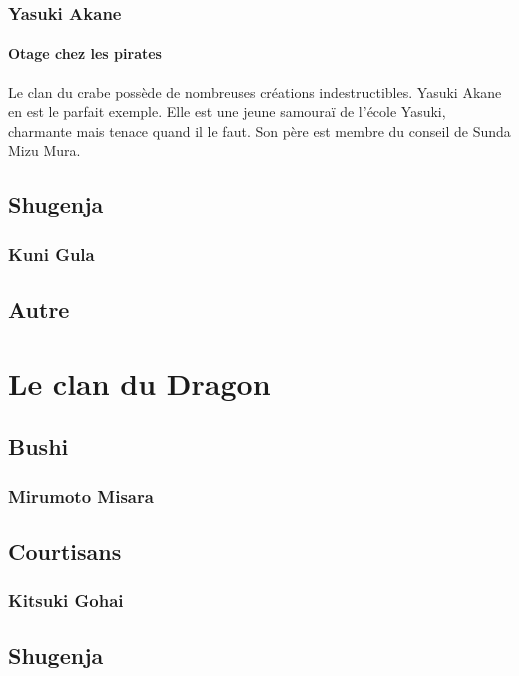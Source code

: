 \documentclass[10pt,a4paper]{book}
\begin{document}
\subsection{Yasuki Akane}
\subsubsection*{Otage chez les pirates}

Le clan du crabe possède de nombreuses créations indestructibles. Yasuki Akane en est le parfait exemple.
Elle est une jeune samouraï de l'école Yasuki, charmante mais tenace quand il le faut. Son père est membre du conseil de Sunda Mizu Mura. 

\section{Shugenja}

\subsection{Kuni Gula}

\section{Autre}

\chapter{Le clan du Dragon}

\section{Bushi}

\subsection{Mirumoto Misara}

\section{Courtisans}

\subsection{Kitsuki Gohai}

\section{Shugenja}
\end{document}

